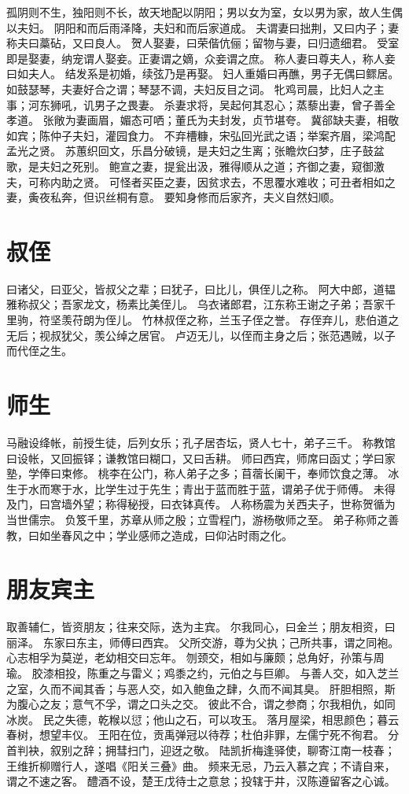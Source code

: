 \documentclass[12pt,UTF8]{ctexbook}
\begin{document}
孤阴则不生，独阳则不长，故天地配以阴阳；男以女为室，女以男为家，故人生偶以夫妇。
阴阳和而后雨泽降，夫妇和而后家道成。
夫谓妻曰拙荆，又曰内子；妻称夫曰藁砧，又曰良人。
贺人娶妻，曰荣偕伉俪；留物与妻，曰归遗细君。
受室即是娶妻，纳宠谓人娶妾。正妻谓之嫡，众妾谓之庶。
称人妻曰尊夫人，称人妾曰如夫人。
结发系是初婚，续弦乃是再娶。
妇人重婚曰再醮，男子无偶曰鳏居。
如鼓瑟琴，夫妻好合之谓；琴瑟不调，夫妇反目之词。
牝鸡司晨，比妇人之主事；河东狮吼，讥男子之畏妻。
杀妻求将，吴起何其忍心；蒸藜出妻，曾子善全孝道。
张敞为妻画眉，媚态可哂；董氏为夫封发，贞节堪夸。
冀郤缺夫妻，相敬如宾；陈仲子夫妇，灌园食力。
不弃槽糠，宋弘回光武之语；举案齐眉，梁鸿配孟光之贤。
苏蕙织回文，乐昌分破镜，是夫妇之生离；张瞻炊臼梦，庄子鼓盆歌，是夫妇之死别。
鲍宣之妻，提瓮出汲，雅得顺从之道；齐御之妻，窥御激夫，可称内助之贤。
可怪者买臣之妻，因贫求去，不思覆水难收；可丑者相如之妻，夤夜私奔，但识丝桐有意。
要知身修而后家齐，夫义自然妇顺。

\chapter{叔侄}

曰诸父，曰亚父，皆叔父之辈；曰犹子，曰比儿，俱侄儿之称。
阿大中郎，道韫雅称叔父；吾家龙文，杨素比美侄儿。
乌衣诸郎君，江东称王谢之子弟；吾家千里驹，符坚羡苻朗为侄儿。
竹林叔侄之称，兰玉子侄之誉。
存侄弃儿，悲伯道之无后；视叔犹父，羡公绰之居官。
卢迈无儿，以侄而主身之后；张范遇贼，以子而代侄之生。

\chapter{师生}

马融设绛帐，前授生徒，后列女乐；孔子居杏坛，贤人七十，弟子三千。
称教馆曰设帐，又回振铎；谦教馆曰糊口，又曰舌耕。
师曰西宾，师席曰函丈；学曰家塾，学俸曰束修。
桃李在公门，称人弟子之多；苜蓿长阑干，奉师饮食之薄。
冰生于水而寒于水，比学生过于先生；青出于蓝而胜于蓝，谓弟子优于师傅。
未得及门，曰宫墙外望；称得秘授，曰衣钵真传。
人称杨震为关西夫子，世称贺循为当世儒宗。
负笈千里，苏章从师之殷；立雪程门，游杨敬师之至。
弟子称师之善教，曰如坐春风之中；学业感师之造成，曰仰沾时雨之化。

\chapter{朋友宾主}

取善辅仁，皆资朋友；往来交际，迭为主宾。
尔我同心，曰金兰；朋友相资，曰丽泽。
东家曰东主，师傅曰西宾。
父所交游，尊为父执；己所共事，谓之同袍。
心志相孚为莫逆，老幼相交曰忘年。
刎颈交，相如与廉颇；总角好，孙策与周瑜。
胶漆相投，陈重之与雷义；鸡黍之约，元伯之与巨卿。
与善人交，如入芝兰之室，久而不闻其香；与恶人交，如入鲍鱼之肆，久而不闻其臭。
肝胆相照，斯为腹心之友；意气不孚，谓之口头之交。
彼此不合，谓之参商；尔我相仇，如同冰炭。
民之失德，乾糇以愆；他山之石，可以攻玉。
落月屋梁，相思颜色；暮云春树，想望丰仪。
王阳在位，贡禹弹冠以待荐；杜伯非罪，左儒宁死不徇君。
分首判袂，叙别之辞；拥彗扫门，迎迓之敬。
陆凯折梅逢驿使，聊寄江南一枝春；王维折柳赠行人，遂唱《阳关三叠》曲。
频来无忌，乃云入慕之宾；不请自来，谓之不速之客。
醴酒不设，楚王戊待士之意怠；投辖于井，汉陈遵留客之心诚。
\end{document}
